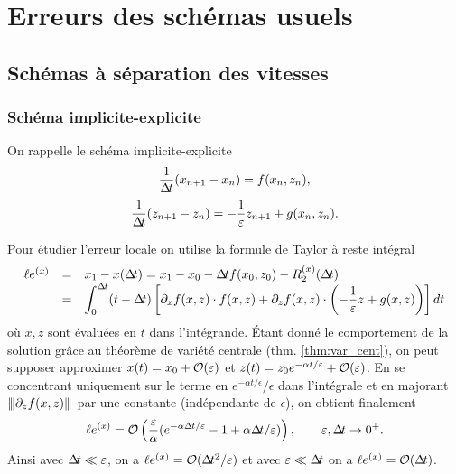 \chapter{Erreurs des schémas usuels}
\label{chap:erreus_schemas}

\section{Schémas à séparation des vitesses}
\label{sec:ann_schemas_sep_vitesses}

\subsection*{Schéma implicite-explicite}

On rappelle le schéma implicite-explicite
$$ \frac{1}{\Delta\!\!\!\ t}(x_{n+1}-x_n) = f(x_n,z_n) ,$$
$$ \frac{1}{\Delta\!\!\!\ t}(z_{n+1}-z_n) = -\frac{1}{\varepsilon} z_{n+1} + g(x_n,z_n) . $$

Pour étudier l'erreur locale on utilise la formule de Taylor à reste intégral 
$$ \begin{array}{rcl} 
\lex &=& x_1-x(\dt) = x_1 - x_0 - \dt f(x_0,z_0) - R^{(x)}_2(\dt) \\
&=& \displaystyle \int_0^{\dt} (t-\dt) \left[\dpx f(x,z)\cdot f(x,z) + \dpz f(x,z)\cdot \left(-\inveps z + g(x,z)\right) \right] dt 
\end{array}  $$
où $x,z$ sont évaluées en $t$ dans l'intégrande. 
Étant donné le comportement de la solution grâce au théorème de variété centrale (thm. \ref{thm:var_cent}), on peut supposer approximer $x(t) = x_0 + \mathcal{O}(\varepsilon)$ et $z(t) = z_0 e^{-\alpha t/\varepsilon} + \mathcal{O}(\varepsilon)$. 
En se concentrant uniquement sur le terme en $e^{-\alpha t/\epsilon}/\epsilon$ dans l'intégrale et en majorant ${\left\vert\kern-0.25ex\left\vert\kern-0.25ex\left\vert \partial_{z} f(x,z) \right\vert\kern-0.25ex\right\vert\kern-0.25ex\right\vert}$ par une constante (indépendante de $\epsilon$), on obtient finalement 
$$ \lex = \O \left(\frac{\epsilon}{\alpha}(e^{-\alpha\dt/\epsilon} - 1 + \alpha\dt/\epsilon)\right), \qquad \epsilon,\dt \rightarrow 0^+ . $$
Ainsi avec $\Delta\!\!\!\ t \ll \varepsilon$, on a $\ell e^{(x)} = \mathcal{O}(\Delta\!\!\!\ t^2/\varepsilon)$ et avec $\varepsilon \ll \Delta\!\!\!\ t$ on a $\ell e^{(x)} = \mathcal{O}(\Delta\!\!\!\ t)$. 

